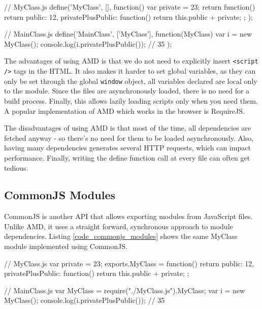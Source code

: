 \begin{code}
// MyClass.js
define('MyClass', [], function(){
  var private = 23;
  return function(){
    return {
      public: 12,
      privatePlusPublic: function(){
        return this.public + private;
      }
    }
  };
});

// MainClass.js
define('MainClass', ['MyClass'], function(MyClass){
  var i = new MyClass();
  console.log(i.privatePlusPublic()); // 35
});
\end{code}

The advantages of using AMD is that we do not need to explicitly insert \lstinline{<script />} tags in the HTML. It also makes it harder to set global variables, as they can only be set through the global \lstinline{window} object, all variables declared are local only to the module. Since the files are asynchronously loaded, there is no need for a build process. Finally, this allows lazily loading scripts only when you need them.
A popular implementation of AMD which works in the browser is RequireJS. 

The disadvantages of using AMD is that most of the time, all dependencies are fetched anyway - so there's no need for them to be loaded asynchronously. Also, having many dependencies generates several HTTP requests, which can impact performance. Finally, writing the define function call at every file can often get tedious.

\subsection{CommonJS Modules} %
\label{sub:commonjs_modules}
CommonJS is another API that allows exporting modules from JavaScript files. Unlike AMD, it uses a straight forward, synchronous approach to module dependencies. Listing \ref{code_commonjs_modules} shows the same MyClass module implemented using CommonJS.

\begin{code}
// MyClass.js
var private = 23;
exports.MyClass = function(){
  return {
    public: 12,
    privatePlusPublic: function(){
      return this.public + private;
    }
  }
};

// MainClass.js
var MyClass = require("./MyClass.js").MyClass;
var i = new MyClass();
console.log(i.privatePlusPublic()); // 35
\end{code}

